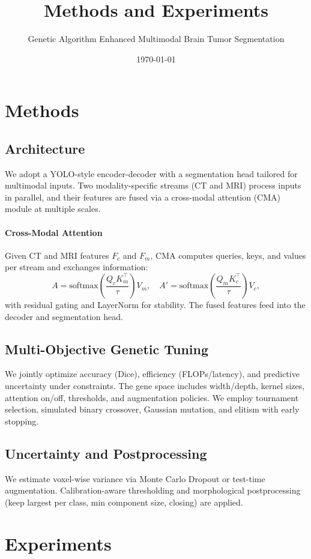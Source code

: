 \documentclass{article}
\title{Methods and Experiments}
\author{Genetic Algorithm Enhanced Multimodal Brain Tumor Segmentation}
\date{\today}
\begin{document}
\maketitle

\section{Methods}
\subsection{Architecture}
We adopt a YOLO-style encoder-decoder with a segmentation head tailored for multimodal inputs. Two modality-specific streams (CT and MRI) process inputs in parallel, and their features are fused via a cross-modal attention (CMA) module at multiple scales.

\paragraph{Cross-Modal Attention}
Given CT and MRI features $F_c$ and $F_m$, CMA computes queries, keys, and values per stream and exchanges information:
\[ A = \mathrm{softmax}\left(\frac{Q_c K_m^\top}{\tau}\right)V_m, \quad A' = \mathrm{softmax}\left(\frac{Q_m K_c^\top}{\tau}\right)V_c, \]
with residual gating and LayerNorm for stability. The fused features feed into the decoder and segmentation head.

\subsection{Multi-Objective Genetic Tuning}
We jointly optimize accuracy (Dice), efficiency (FLOPs/latency), and predictive uncertainty under constraints. The gene space includes width/depth, kernel sizes, attention on/off, thresholds, and augmentation policies. We employ tournament selection, simulated binary crossover, Gaussian mutation, and elitism with early stopping.

\subsection{Uncertainty and Postprocessing}
We estimate voxel-wise variance via Monte Carlo Dropout or test-time augmentation. Calibration-aware thresholding and morphological postprocessing (keep largest per class, min component size, closing) are applied.

\section{Experiments}
\end{document}
